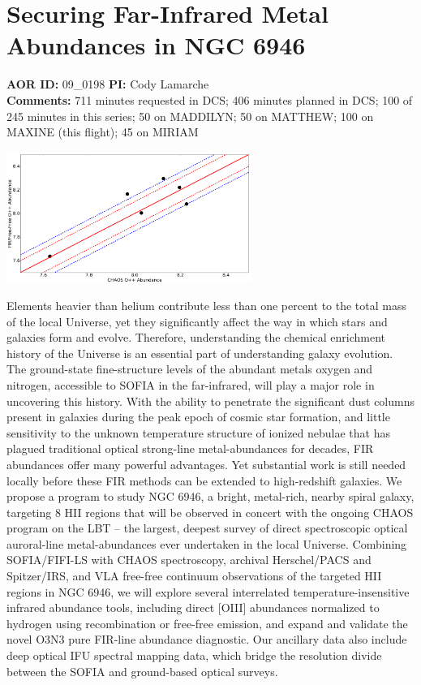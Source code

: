 \documentclass[10pt]{article}
\begin{document}
\section{Securing Far-Infrared Metal Abundances in NGC 6946}
{\large {\bf AOR ID:} 09\_0198 {\bf PI:} Cody Lamarche}\\
{\bf Comments:}  711 minutes requested in DCS;  406 minutes planned in DCS;  100 of 245 minutes in this series;  50 on MADDILYN;  50 on MATTHEW;  100 on MAXINE (this flight);  45 on MIRIAM\\
\begin{center}
\includegraphics[width=0.60\textwidth]{../test/09_0198/1.png}
\end{center}
Elements heavier than helium contribute less than one percent to the total mass of the local Universe, yet they significantly affect the way in which stars and galaxies form and evolve. Therefore, understanding the chemical enrichment history of the Universe is an essential part of understanding galaxy evolution. The ground-state fine-structure levels of the abundant metals oxygen and nitrogen, accessible to SOFIA in the far-infrared, will play a major role in uncovering this history. With the ability to penetrate the significant dust columns present in galaxies during the peak epoch of cosmic star formation, and little sensitivity to the unknown temperature structure of ionized nebulae that has plagued traditional optical strong-line metal-abundances for decades, FIR abundances offer many powerful advantages. Yet substantial work is still needed locally before these FIR methods can be extended to high-redshift galaxies. We propose a program to study NGC 6946, a bright, metal-rich, nearby spiral galaxy, targeting 8 HII regions that will be observed in concert with the ongoing CHAOS program on the LBT -- the largest, deepest survey of direct spectroscopic optical auroral-line metal-abundances ever undertaken in the local Universe. Combining SOFIA/FIFI-LS with CHAOS spectroscopy, archival Herschel/PACS and Spitzer/IRS, and VLA free-free continuum observations of the targeted HII regions in NGC 6946, we will explore several interrelated temperature-insensitive infrared abundance tools, including direct [OIII] abundances normalized to hydrogen using recombination or free-free emission, and expand and validate the novel O3N3 pure FIR-line abundance diagnostic. Our ancillary data also include deep optical IFU spectral mapping data, which bridge the resolution divide between the SOFIA and ground-based optical surveys.
\end{document}
